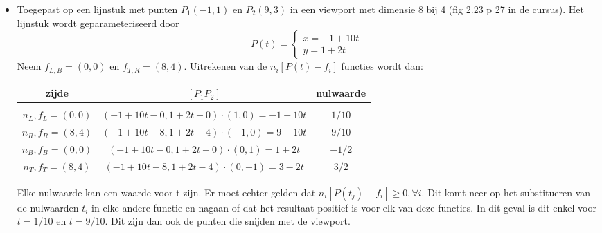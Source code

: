 \documentclass{report}
\begin{document}
\begin{enumerate}
{\begin{itemize}
				\item Toegepast op een lijnstuk met punten $P_1(-1, 1)$ en $P_2(9, 3)$ in een viewport met dimensie 8 bij 4 (fig 2.23 p 27 in de cursus). Het lijnstuk wordt geparameteriseerd door $$P(t) = \begin{cases}
				x = -1 + 10t \\
				y = 1 + 2t
				\end{cases}$$
				Neem $f_{L, B} = (0, 0)$ en $f_{T, R} = (8, 4)$. Uitrekenen van de $n_i[P(t) - f_i]$ functies wordt dan:
				\begin{table}[h]
					\centering
					\begin{tabular}{c | c | c}
						zijde & $[P_1P_2]$  & nulwaarde\\ 
						\hline 
						\\
						$n_L, f_L = (0, 0)$ & $(-1 + 10t - 0, 1 + 2t - 0) \cdot (1, 0) = -1 + 10t$ & $1/10$\\
						$n_R, f_R = (8, 4)$ & $(-1 + 10t - 8, 1 + 2t - 4) \cdot (-1, 0) = 9 - 10t$ & $9/10$\\
						$n_B, f_B = (0, 0)$ & $(-1 + 10t - 0, 1 + 2t - 0) \cdot (0, 1) =  1 + 2t$ & $-1/2$\\
						$n_T, f_T = (8, 4)$ & $(-1 + 10t - 8, 1 + 2t - 4) \cdot (0, -1) = 3 - 2t$  & $3/2$\\
					\end{tabular}
				\end{table}
				Elke nulwaarde kan een waarde voor t zijn. 	Er moet echter gelden dat $n_i[P(t_j) - f_i] \geq 0, \forall i$. Dit komt neer op het substitueren van de nulwaarden $t_i$ in elke andere functie en nagaan of dat het resultaat positief is voor elk van deze functies. In dit geval is dit enkel voor $t = 1/10$ en $t = 9/10$. Dit zijn dan ook de punten die snijden met de viewport.
			\end{itemize}
		}
		
	\end{enumerate}
\end{document}
